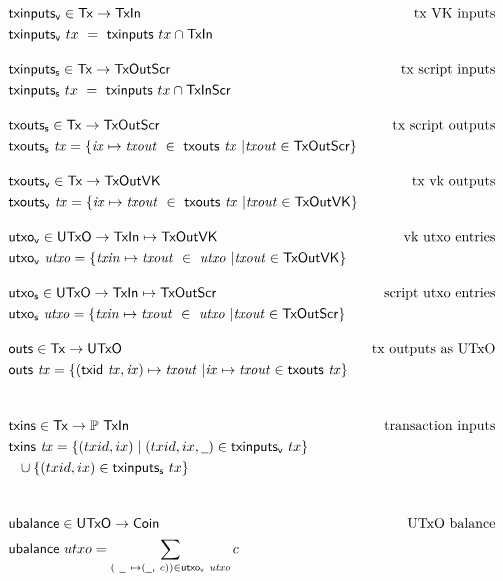 \begin{figure}[htb]
  \begin{align*}
    & \fun{txinputs_v} \in \Tx \to \TxIn
    & \text{tx VK inputs} \\
    & \fun{txinputs_v} ~tx ~=~ \fun{txinputs} ~tx\cap \TxIn
    \nextdef
    & \fun{txinputs_s} \in \Tx \to \TxOutScr
    & \text{tx script inputs} \\
    & \fun{txinputs_s} ~tx ~=~ \fun{txinputs} ~tx\cap \TxInScr
    \nextdef
    & \fun{txouts_s} \in \Tx \to \TxOutScr
    & \text{tx script outputs} \\
    & \fun{txouts_s} ~ \var{tx} =
        \left\{
          \var{ix} \mapsto \var{txout}~\in ~\txouts{tx} ~
          \middle|
          \var{txout} \in \TxOutScr
        \right\}
    \nextdef
    & \fun{txouts_v} \in \Tx \to \TxOutVK
    & \text{tx vk outputs} \\
    & \fun{txouts_v} ~ \var{tx} =
      \left\{
        \var{ix} \mapsto \var{txout} ~\in ~\txouts{tx}~
        \middle|
        \var{txout} \in \TxOutVK
      \right\}
    \nextdef
    & \fun{utxo_v} \in \UTxO \to \TxIn \mapsto \TxOutVK
    & \text{vk utxo entries} \\
    & \fun{utxo_v} ~ \var{utxo} =
        \left\{
          \var{txin} \mapsto \var{txout} ~\in~ \var{utxo}  ~
          \middle|
          \var{txout} \in \TxOutVK
        \right\}
    \nextdef
    & \fun{utxo_s} \in \UTxO \to \TxIn \mapsto \TxOutScr
    & \text{script utxo entries} \\
    & \fun{utxo_s} ~ \var{utxo} =
        \left\{
          \var{txin} \mapsto \var{txout} ~\in~ \var{utxo}~
          \middle|
          \var{txout} \in \TxOutScr
        \right\}
    \nextdef
    & \fun{outs} \in \Tx \to \UTxO
    & \text{tx outputs as UTxO} \\
    & \fun{outs} ~ \var{tx} =
        \left\{
          (\fun{txid} ~ \var{tx}, \var{ix}) \mapsto \var{txout} ~
          \middle|
          \var{ix} \mapsto \var{txout} \in \txouts{tx}
        \right\} \\
    \nextdef
    & \fun{txins} \in \Tx \to \powerset{\TxIn} & \text{transaction inputs} \\
    & \fun{txins} ~\var{tx} = \{(txid,ix) \mid (txid,ix,\wcard)\in\fun{txinputs_v} ~tx\} \\
    & ~~\cup \{(txid,ix)\in\fun{txinputs_s}~ tx\} \\
    \nextdef
    & \fun{ubalance} \in \UTxO \to \Coin
    & \text{UTxO balance} \\
    & \fun{ubalance} ~ utxo = \sum_{(~\wcard ~ \mapsto (\wcard, ~c)) \in \fun{utxo_v}~\var{utxo}} c \\

\end{align*}
\end{figure}
